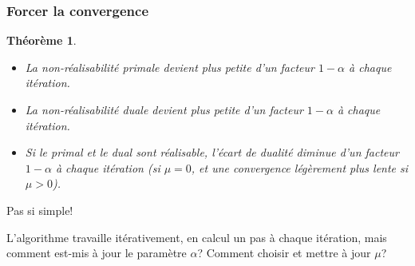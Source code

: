 \documentclass[t, aspectratio=169,usepdftitle=false]{beamer}
\newtheorem{thm}{Théorème}
\begin{document}
\begin{frame}
\frametitle{Forcer la convergence}

\begin{thm}
\begin{itemize}
\item
La non-réalisabilité primale devient plus petite d'un facteur $1 - \alpha$ à chaque itération.
\item
La non-réalisabilité duale devient plus petite d'un facteur $1 - \alpha$ à chaque itération.
\item
Si le primal et le dual sont réalisable, l'écart de dualité diminue d'un facteur $1-\alpha$ à chaque itération (si $\mu = 0$, et une convergence légèrement plus lente si $\mu > 0$).
\end{itemize}
\end{thm}


Pas si simple!

\mbox{}

L'algorithme travaille itérativement, en calcul un pas à chaque itération, mais comment est-mis à jour le paramètre $\alpha$? Comment choisir et mettre à jour $\mu$?

\end{frame}
\end{document}

